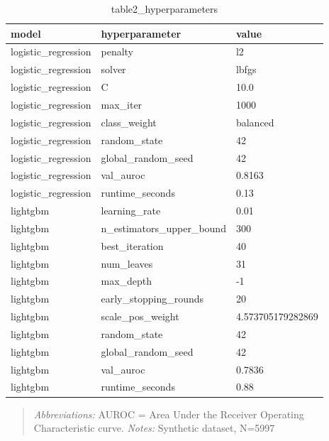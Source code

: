 \begin{table}[htbp]
\centering
\caption{table2_hyperparameters}
\label{table2_hyperparameters}
\begin{tabular}{lll}
\toprule
model & hyperparameter & value \\
\midrule
logistic\_regression & penalty & l2 \\
logistic\_regression & solver & lbfgs \\
logistic\_regression & C & 10.0 \\
logistic\_regression & max\_iter & 1000 \\
logistic\_regression & class\_weight & balanced \\
logistic\_regression & random\_state & 42 \\
logistic\_regression & global\_random\_seed & 42 \\
logistic\_regression & val\_auroc & 0.8163 \\
logistic\_regression & runtime\_seconds & 0.13 \\
lightgbm & learning\_rate & 0.01 \\
lightgbm & n\_estimators\_upper\_bound & 300 \\
lightgbm & best\_iteration & 40 \\
lightgbm & num\_leaves & 31 \\
lightgbm & max\_depth & -1 \\
lightgbm & early\_stopping\_rounds & 20 \\
lightgbm & scale\_pos\_weight & 4.573705179282869 \\
lightgbm & random\_state & 42 \\
lightgbm & global\_random\_seed & 42 \\
lightgbm & val\_auroc & 0.7836 \\
lightgbm & runtime\_seconds & 0.88 \\
\bottomrule
\end{tabular}

\end{table}


\begin{quote}\small
\textit{Abbreviations:} AUROC = Area Under the Receiver Operating Characteristic curve.
\textit{Notes:} Synthetic dataset, N=5997
\end{quote}
